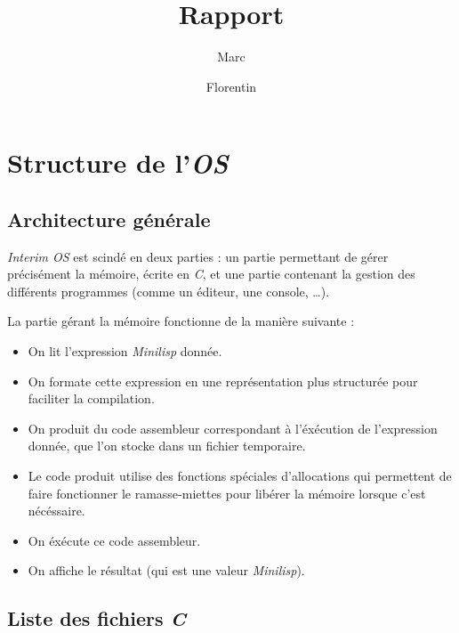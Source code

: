 \documentclass[a4paper, 10pt, french]{article}
\title{Rapport \foreign{Interim OS}}
\author{Marc \bsc{Ducret} \and Florentin \bsc{Guth}}
\newcommand{\foreign}[1]{\emph{#1}}
\begin{document}
\maketitle
\vfill
\tableofcontents
\vfill
\clearpage
\section{Structure de l'\foreign{OS}}

\subsection{Architecture générale}

\foreign{Interim OS} est scindé en deux parties : un partie permettant de gérer précisément la mémoire, écrite en \foreign{C}, et une partie contenant la gestion des différents programmes (comme un éditeur, une console, \ldots).

La partie gérant la mémoire fonctionne de la manière suivante :
\begin{itemize}
  \item On lit l'expression \foreign{Minilisp} donnée.
  \item On formate cette expression en une représentation plus structurée pour faciliter la compilation.
  \item On produit du code assembleur correspondant à l'éxécution de l'expression donnée, que l'on stocke dans un fichier temporaire.
  \item Le code produit utilise des fonctions spéciales d'allocations qui permettent de faire fonctionner le ramasse-miettes pour libérer la mémoire lorsque c'est nécéssaire.
  \item On éxécute ce code assembleur.
  \item On affiche le résultat (qui est une valeur \foreign{Minilisp}).
\end{itemize}

\subsection{Liste des fichiers \foreign{C}}
\end{document}
